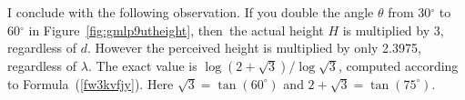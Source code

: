 \documentclass[10pt]{article}
\begin{document}
I conclude with the following observation. If you double the angle $\theta$ from 30$^\circ$ to 60$^\circ$ in 
Figure~\ref{fig:gmlp9utheight}, then~the actual height $H$ is multiplied by 3, regardless of $d$. However the perceived height
 is multiplied by only 2.3975, regardless of $\lambda$. The exact value is $\log(2+\sqrt{3})/\log\sqrt{3}$, computed according to Formula~(\ref{fw3kvfjy}).
Here $\sqrt{3}=\tan(60^\circ)$ and $2+\sqrt{3}=\tan(75^\circ)$.
 












\hypersetup{linkcolor=red} %
\hypersetup{linkcolor=red}
\end{document}
